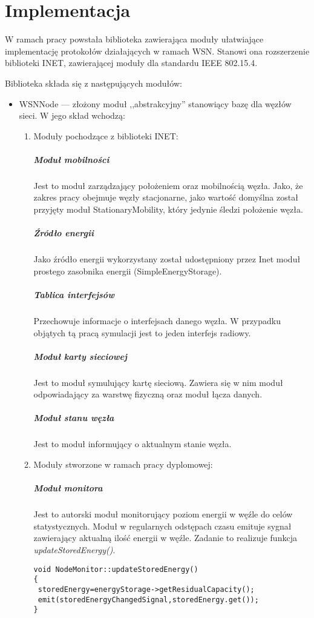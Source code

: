 \chapter{Implementacja}
W ramach pracy powstała biblioteka zawierająca moduły ułatwiające implementację protokołów działających w ramach WSN. Stanowi ona rozszerzenie biblioteki INET, zawierającej moduły dla standardu IEEE 802.15.4.

Biblioteka składa się z następujących modułów:
\begin{itemize}
	\item WSNNode --- złożony moduł ,,abstrakcyjny'' stanowiący bazę dla węzłów sieci. W jego skład wchodzą:
\begin{enumerate}
\item Moduły pochodzące z biblioteki INET:
\paragraph{Moduł mobilności} Jest to moduł zarządzający położeniem oraz mobilnością węzła. Jako, że zakres pracy obejmuje węzły stacjonarne, jako wartość domyślna został przyjęty moduł StationaryMobility, który jedynie śledzi położenie węzła.
\paragraph{Źródło energii} Jako źródło energii wykorzystany został udostępniony przez Inet moduł prostego zasobnika energii (SimpleEnergyStorage).
\paragraph{Tablica interfejsów} Przechowuje informacje o interfejsach danego węzła. W przypadku objątych tą pracą symulacji jest to jeden interfejs radiowy.
\paragraph{Moduł karty sieciowej} Jest to moduł symulujący kartę sieciową. Zawiera się w nim moduł odpowiadający za warstwę fizyczną oraz moduł łącza danych.
\paragraph{Moduł stanu węzła} Jest to moduł informujący o aktualnym stanie węzła.
\item Moduły stworzone w ramach pracy dyplomowej:
\paragraph{Moduł monitora} Jest to autorski moduł monitorujący poziom energii w węźle do celów statystycznych. Moduł w regularnych odstępach czasu emituje sygnał zawierający aktualną ilość energii w węźle. Zadanie to realizuje funkcja \textit{updateStoredEnergy()}.
\begin{verbatim}
void NodeMonitor::updateStoredEnergy()
{
 storedEnergy=energyStorage->getResidualCapacity();
 emit(storedEnergyChangedSignal,storedEnergy.get());
}
\end{verbatim}

\end{enumerate}
\end{itemize}
